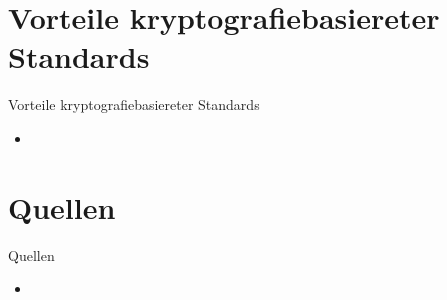 \documentclass{beamer}
\begin{document}
\section{Vorteile kryptografiebasiereter Standards}
\begin{frame}{Vorteile kryptografiebasiereter Standards}
	\begin{itemize}
		\item
	\end{itemize}
\end{frame}


\section{Quellen}
\begin{frame}{Quellen}
	\begin{itemize}
		\item
	\end{itemize}
\end{frame}

\end{document}
